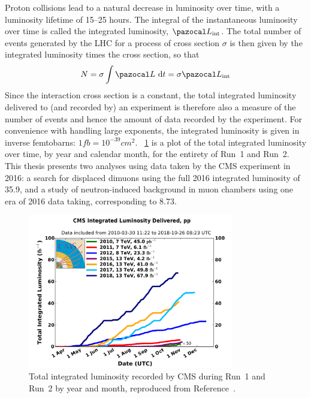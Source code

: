Proton collisions lead to a natural decrease in luminosity over time, with a luminosity lifetime of 15--25 hours.
The integral of the instantaneous luminosity over time is called the integrated luminosity, $\intlumi$.
The total number of events generated by the LHC for a process of cross section $\sigma$ is then given by the integrated luminosity times the cross section, so that
\begin{align}
  N = \sigma \int{\lumi\,\dd t} = \sigma \intlumi
  \label{cms:intlumi}
\end{align}
Since the \pp interaction cross section is a constant, the total integrated luminosity delivered to (and recorded by) an experiment is therefore also a measure of the number of events and hence the amount of data recorded by the experiment.
For convenience with handling large exponents, the integrated luminosity is given in inverse femtobarns: $1\unit{fb} = 10^{-39}\unit{cm}^2$.
\Fig~\ref{cms:totallumi} is a plot of the total \pp integrated luminosity over time, by year and calendar month, for the entirety of Run~1 and Run~2.
This thesis presents two analyses using data taken by the CMS experiment in 2016: a search for displaced dimuons using the full 2016 integrated luminosity of 35.9\fbinv, and a study of neutron-induced background in muon chambers using one era of 2016 data taking, corresponding to 8.73\fbinv.

\begin{figure}[tpb]
  \centering
  \includegraphics[width=0.8\textwidth]{figures/cms/CMSIntLumi.pdf}
  \caption[Total \pp integrated luminosity recorded by CMS during Run~1 and Run~2 by year and month.]{Total \pp integrated luminosity recorded by CMS during Run~1 and Run~2 by year and month, reproduced from Reference~\cite{LumiTwiki}.}
  \label{cms:totallumi}
\end{figure}

